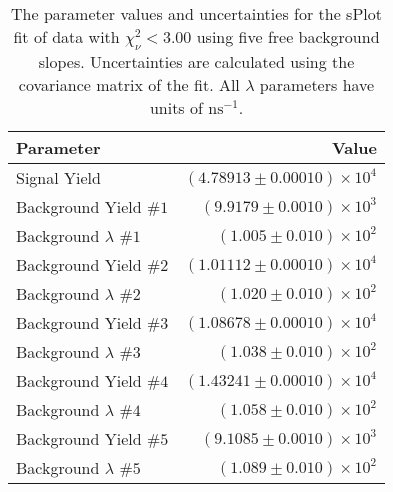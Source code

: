 
\begin{table}[ht]
    \begin{center}
        \begin{tabular}{lr}\toprule
            Parameter & Value \\\midrule
            Signal Yield & $(4.78913 \pm 0.00010) \times 10^{4}$ \\
            Background Yield $\#1$ & $(9.9179 \pm 0.0010) \times 10^{3}$ \\
            Background $\lambda$ $\#1$ & $(1.005 \pm 0.010) \times 10^{2}$ \\
            Background Yield $\#2$ & $(1.01112 \pm 0.00010) \times 10^{4}$ \\
            Background $\lambda$ $\#2$ & $(1.020 \pm 0.010) \times 10^{2}$ \\
            Background Yield $\#3$ & $(1.08678 \pm 0.00010) \times 10^{4}$ \\
            Background $\lambda$ $\#3$ & $(1.038 \pm 0.010) \times 10^{2}$ \\
            Background Yield $\#4$ & $(1.43241 \pm 0.00010) \times 10^{4}$ \\
            Background $\lambda$ $\#4$ & $(1.058 \pm 0.010) \times 10^{2}$ \\
            Background Yield $\#5$ & $(9.1085 \pm 0.0010) \times 10^{3}$ \\
            Background $\lambda$ $\#5$ & $(1.089 \pm 0.010) \times 10^{2}$ \\\bottomrule
        \end{tabular}
        \caption{The parameter values and uncertainties for the sPlot fit of data with $\chi^2_\nu < 3.00$ using five free background slopes. Uncertainties are calculated using the covariance matrix of the fit. All $\lambda$ parameters have units of $\si{\nano\second}^{-1}$.}\label{tab:splot-fit-results-chisqdof-3.00-free-5}
    \end{center}
\end{table}
